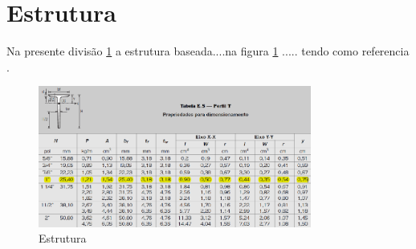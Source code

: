 \section{Estrutura} \label{Secao Estrutura}

Na presente divisão \ref{Secao Estrutura}  a estrutura baseada....na figura \ref{fig:awesome_image} ..... tendo como referencia \cite{shigley2011shigley}.

\begin{figure}[h]
    \centering
    \includegraphics[width=0.8\textwidth]{figuras/perfil_t.png}
    \caption{Estrutura}
    \label{fig:awesome_image}
\end{figure}
